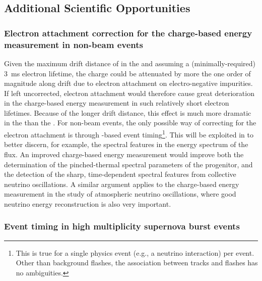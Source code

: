 
\subsection{Additional Scientific Opportunities}
\label{subsec:dp-pds-requirements_opportunities}

\subsubsection{Electron attachment correction for the charge-based energy measurement in non-beam events}
\label{subsubsec:dp-pds-requirements_attachment}

Given the maximum drift distance of \dpmaxdrift in the \dual {} and assuming a (minimally-required) \SI{3}{\ms} electron lifetime, the charge could be attenuated by more the one order of magnitude along drift due to electron attachment on electro-negative impurities. If left uncorrected, electron attachment would therefore cause great deterioration in the charge-based energy measurement in such relatively short electron lifetimes. Because of the longer drift distance, this effect is much more dramatic in the  than the . For non-beam events, the only possible way of correcting for the electron attachment is through -based event timing\footnote{This is true for a single physics event (e.g., a neutrino interaction) per  event. Other than background flashes, the association between  tracks and  flashes has no ambiguities.}. This will be exploited in \dune to better discern, for example, the spectral features in the energy spectrum of the  flux. An improved charge-based energy measurement would improve both the determination of the pinched-thermal spectral parameters of the progenitor, and the detection of the sharp, time-dependent spectral features from collective neutrino oscillations. A similar argument applies to the charge-based energy measurement in the study of atmospheric neutrino oscillations, where good neutrino energy reconstruction is also very important.

\subsubsection{Event timing in high multiplicity supernova burst events}

